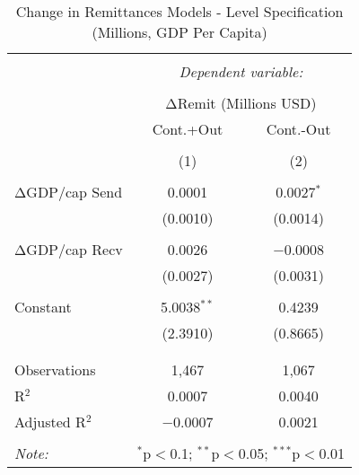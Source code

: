 
\begin{table}[!htbp] \centering 
  \caption{Change in Remittances Models - Level Specification (Millions, GDP Per Capita)} 
  \label{} 
\begin{tabular}{@{\extracolsep{5pt}}lcc} 
\\[-1.8ex]\hline 
\hline \\[-1.8ex] 
 & \multicolumn{2}{c}{\textit{Dependent variable:}} \\ 
\cline{2-3} 
\\[-1.8ex] & \multicolumn{2}{c}{ΔRemit (Millions USD)} \\ 
 & Cont.+Out & Cont.-Out \\ 
\\[-1.8ex] & (1) & (2)\\ 
\hline \\[-1.8ex] 
 ΔGDP/cap Send & 0.0001 & 0.0027$^{*}$ \\ 
  & (0.0010) & (0.0014) \\ 
  & & \\ 
 ΔGDP/cap Recv & 0.0026 & $-$0.0008 \\ 
  & (0.0027) & (0.0031) \\ 
  & & \\ 
 Constant & 5.0038$^{**}$ & 0.4239 \\ 
  & (2.3910) & (0.8665) \\ 
  & & \\ 
\hline \\[-1.8ex] 
Observations & 1,467 & 1,067 \\ 
R$^{2}$ & 0.0007 & 0.0040 \\ 
Adjusted R$^{2}$ & $-$0.0007 & 0.0021 \\ 
\hline 
\hline \\[-1.8ex] 
\textit{Note:}  & \multicolumn{2}{r}{$^{*}$p$<$0.1; $^{**}$p$<$0.05; $^{***}$p$<$0.01} \\ 
\end{tabular} 
\end{table} 

